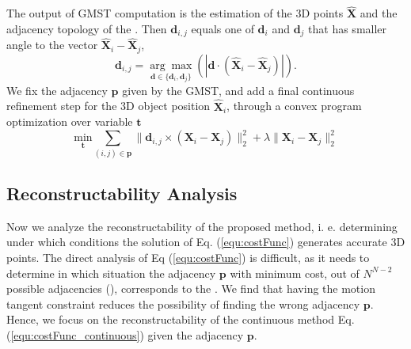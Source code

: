 The output of GMST computation is the estimation of the 3D points $\mathbf{\widehat{X}}$ and the adjacency topology of the \oct. Then $\mathbf{d}_{i,j}$ equals one of $\mathbf{d}_i$ and $\mathbf{d}_j$  that has smaller angle to the vector $\mathbf{\widehat{X}}_i - \mathbf{\widehat{X}}_j$,
\begin{equation}
\mathbf{d}_{i,j}= \underset{\mathbf{d}\in{\{\mathbf{d}_i, \mathbf{d}_j}\} }{\arg\!\max}(|\mathbf{d} \cdot (\mathbf{\widehat{X}}_i - \mathbf{\widehat{X}}_j)| ).
\end{equation}
We fix the adjacency $\mathbf{p}$ given by the GMST, and add a final continuous refinement step for the 3D object position $\mathbf{\hat{X}}_i$, through a convex program optimization over variable $\mathbf{t}$
\begin{equation}
\underset{\mathbf{t}} { \text{min} }
\sum_{(i,j)\in{\mathbf{p}}}{\|\mathbf{d}_{i,j}\times(\mathbf{X}_i-\mathbf{X}_j)\|_2^2 + \lambda\|\mathbf{X}_i-\mathbf{X}_j\|_2^2}
\label{equ:costFunc_continuous}
\end{equation}


\subsection{Reconstructability Analysis} \label{sec:analysis}

Now we analyze the reconstructability of the proposed method, i. e. determining under which conditions the solution of Eq. (\ref{equ:costFunc}) generates accurate 3D points. The direct analysis of Eq (\ref{equ:costFunc}) is difficult, as it needs to determine in which situation the adjacency $\mathbf{p}$ with minimum cost, out of $N^{N-2}$ possible adjacencies (\cite{wiki_cayley_alg}), corresponds to the \oct. %
We find that having the motion tangent constraint reduces the possibility of finding the wrong adjacency $\mathbf{p}$. Hence, we focus on  the reconstructability of the continuous method Eq. (\ref{equ:costFunc_continuous}) given the adjacency $\mathbf{p}$.

